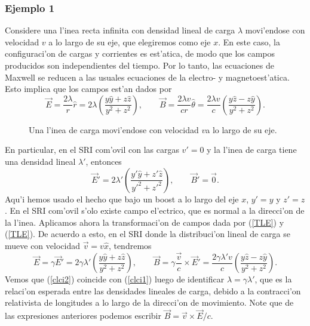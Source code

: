 \subsubsection{Ejemplo 1}
Considere una l'inea recta infinita con densidad lineal de carga $\lambda$ movi'endose con velocidad $v$ a lo largo de su eje, que elegiremos como eje $x$. En este caso, la configuraci'on de cargas y corrientes es est'atica, de modo que los campos producidos son independientes del tiempo. Por lo tanto, las ecuaciones de Maxwell se reducen a las usuales ecuaciones de la electro- y magnetoest'atica. Esto implica que los campos est'an dados por
\begin{equation}
 \vec{E}=\frac{2\lambda}{r}\hat{r}=2\lambda\left( \frac{y\hat{y}+z\hat{z}}{y^2+z^2}\right) , \qquad \vec{B}=\frac{2\lambda v}{cr}\hat\theta=\frac{2\lambda v}{c}\left( \frac{y\hat{z}-z\hat{y}}{y^2+z^2}\right) . \label{clci1}
\end{equation}
\begin{figure}[h!]
\begin{center}
\centerline{}
\end{center}
\caption{Una l'inea de carga movi'endose con velocidad $v$a lo largo de su eje.} \label{fig:bc01}
\end{figure}
En particular, en el SRI com'ovil con las cargas $v'=0$ y la l'inea de carga tiene una densidad lineal $\lambda'$, entonces
\begin{equation}
 \vec{E}'=2\lambda'\left( \frac{y'\hat{y}+z'\hat{z}}{y'^2+z'^2}\right) , \qquad \vec{B}'=\vec{0}.
\end{equation}
Aqu'i hemos usado el hecho que bajo un boost a lo largo del eje $x$, $y'=y$ y $z'=z$. En el SRI com'ovil s'olo existe campo el'ectrico, que es normal a la direcci'on de la l'inea. Aplicamos ahora la transformaci'on de campos dada por (\ref{TLE}) y (\ref{TLE}). De acuerdo a esto, en el SRI donde la distribuci'on lineal de carga se mueve con velocidad $\vec{v}=v\hat{x}$, tendremos
\begin{equation}
 \vec{E}=\gamma\vec{E}'=2\gamma\lambda'\left( \frac{y\hat{y}+z\hat{z}}{y^2+z^2}\right) , \qquad \vec{B}=\gamma \frac{\vec{v}}{c}\times\vec{E}'=\frac{2\gamma\lambda' v}{c}\left( \frac{y\hat{z}-z\hat{y}}{y^2+z^2}\right). \label{clci2}
\end{equation}
Vemos que (\ref{clci2}) coincide con (\ref{clci1}) luego de identificar $\lambda=\gamma\lambda'$, que es la relaci'on esperada entre las densidades lineales de carga, debido a la contracci'on relativista de longitudes a lo largo de la direcci'on de movimiento. Note que de las expresiones anteriores podemos escribir  $\vec{B}=\vec{v}\times\vec{E}/c$.

